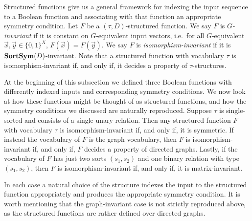 \documentclass[../paper.tex]{subfiles}
\begin{document}

Structured functions give us a general framework for indexing the input sequence to a Boolean function and associating with that function an appropriate symmetry condition. Let $F$ be a
$(\tau, D)$-structured function. We say $F$ is \emph{$G$-invariant} if it is
constant on $G$-equivalent input vectors, i.e.\ for all $G$-equivalent $\vec{x},
\vec{y} \in \{0,1\}^{X}$, $F(\vec{x}) = F(\vec{y})$. We say $F$ is
\emph{isomorphism-invariant} if it is $\text{\textbf{SortSym}} (D)$-invariant. Note that
a structured function with vocabulary $\tau$ is isomorphism-invariant if, and
only if, it decides a property of $\tau$-structures.

At the beginning of this subsection we defined three Boolean functions with
differently indexed inputs and corresponding symmetry conditions. We now look at
how these functions might be thought of as structured functions, and how the
symmetry conditions we discussed are naturally reproduced. Suppose $\tau$ is
single-sorted and consists of a single unary relation. Then any structured
function $F$ with vocabulary $\tau$ is isomorphism-invariant if, and only if, it
is symmetric. If instead the vocabulary of $F$ is the graph vocabulary, then $F$
is isomorphism-invariant if, and only if, $F$ decides a property of directed
graphs. Lastly, if the vocabulary of $F$ has just two sorts $(s_1, s_2)$ and one
binary relation with type $(s_1, s_2)$, then $F$ is isomorphism-invariant if,
and only if, it is matrix-invariant.

In each case a natural choice of the structure indexes the input to the
structured function appropriately and produces the appropriate symmetry
condition. It is worth mentioning that the graph-invariant case is not strictly
reproduced above, as the structured functions are rather defined over directed
graphs.
\end{document}
